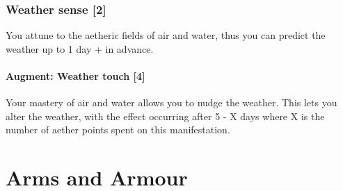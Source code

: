 \documentclass[a4paper,11pt,oneside]{book}
\newcommand{\textlf}[1]{\textbf{\titlecap{#1}}}
\begin{document}
\subsection{Weather sense [2]}
You attune to the aetheric fields of air and water, thus you can predict the weather up to 1 day + \textlf{wit} in advance.
\subsubsection{Augment: Weather touch [4]}
Your mastery of air and water allows you to nudge the weather. This lets you alter the weather, with the effect occurring after 5 - X days where X is the number of aether points spent on this manifestation. 





\chapter{Arms and Armour}
\label{chap:arms}
\end{document}
